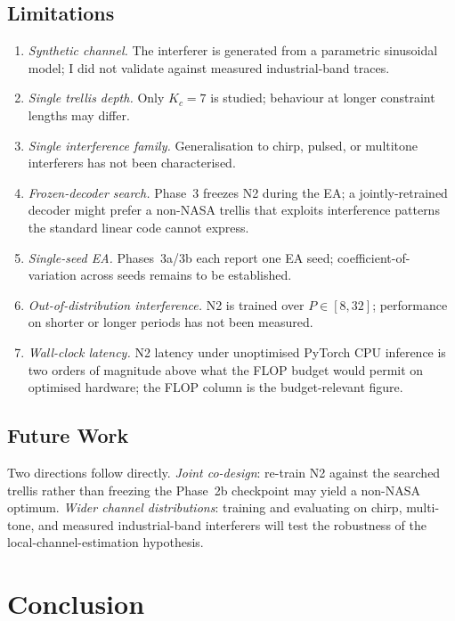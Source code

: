 \documentclass[conference]{IEEEtran}
\begin{document}
\subsection{Limitations}
\label{sec:limitations}
\begin{enumerate}
  \item \emph{Synthetic channel.}  The interferer is generated from a
    parametric sinusoidal model; I did not validate against measured
    industrial-band traces.
  \item \emph{Single trellis depth.}  Only $K_c = 7$ is studied;
    behaviour at longer constraint lengths may differ.
  \item \emph{Single interference family.}  Generalisation to chirp,
    pulsed, or multitone interferers has not been characterised.
  \item \emph{Frozen-decoder search.}  Phase~3 freezes N2 during the EA;
    a jointly-retrained decoder might prefer a non-NASA trellis that
    exploits interference patterns the standard linear code cannot
    express.
  \item \emph{Single-seed EA.}  Phases~3a/3b each report one EA seed;
    coefficient-of-variation across seeds remains to be established.
  \item \emph{Out-of-distribution interference.}  N2 is trained over
    $P\in[8,32]$; performance on shorter or longer periods has not been
    measured.
  \item \emph{Wall-clock latency.}  N2 latency under unoptimised
    PyTorch CPU inference is two orders of magnitude above what the
    FLOP budget would permit on optimised hardware; the FLOP column is
    the budget-relevant figure.
\end{enumerate}

\subsection{Future Work}
Two directions follow directly.  \emph{Joint co-design}: re-train N2
against the searched trellis rather than freezing the Phase~2b
checkpoint may yield a non-NASA optimum.  \emph{Wider channel
distributions}: training and evaluating on chirp, multi-tone, and
measured industrial-band interferers will test the robustness of the
local-channel-estimation hypothesis.

\section{Conclusion}
\label{sec:conclusion}
\end{document}
